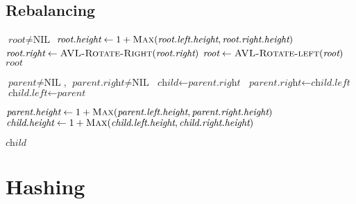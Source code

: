\subsection{Rebalancing}

\begin{algorithm}[H] \begin{algorithmic}[1]
        \Require $\textit{root} \neq \text{NIL}$
        \State {}
        \State $\textit{root.height} \gets 1 + \textsc{Max}(\textit{root.left.height}, \textit{root.right.height})$
        \State {}
            \State {}
                \State $\textit{root.right} \gets \textsc{AVL-Rotate-Right}(\textit{root.right})$
            \EndIf
            \State $\textit{root} \gets \textsc{AVL-Rotate-left}(\textit{root})$
        \EndIf
        \State \Return $\textit{root}$
    \EndProcedure
\end{algorithmic} \end{algorithm}

\begin{algorithm}[H] \begin{algorithmic}[1]
        \Require $\textit{parent} \neq \text{NIL}$, $\textit{parent.right} \neq \text{NIL}$
        \State {}
        \State $\textit{child} \gets \textit{parent.right}$
        \State $\textit{parent.right} \gets \textit{child.left}$
        \State $\textit{child.left} \gets \textit{parent}$

        \State {}
        \State $\textit{parent.height} \gets 1 + \textsc{Max}(\textit{parent.left.height}, \textit{parent.right.height})$
        \State $\textit{child.height} \gets 1 + \textsc{Max}(\textit{child.left.height}, \textit{child.right.height})$

        \State {}
        \State \Return $\textit{child}$
    \EndProcedure
\end{algorithmic} \end{algorithm}

\section{Hashing}

